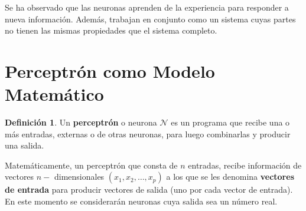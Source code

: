 \documentclass[11pt,letterpaper]{article}
\theoremstyle{definition}
\newtheorem{defi}{Definición}[section]%
\theoremstyle{definition}
\theoremstyle{definition}
\theoremstyle{definition}
\theoremstyle{definition}
\theoremstyle{definition}
\theoremstyle{definition}
\theoremstyle{definition}
\begin{document}
Se ha observado que las neuronas aprenden de la experiencia para responder a nueva información. Además, trabajan en conjunto como un sistema cuyas partes no tienen las mismas propiedades que el sistema completo.
\section{Perceptrón como Modelo Matemático}
\begin{defi}
	Un \textbf{perceptrón} o neurona $ \mathcal{N} $ es un programa que recibe una o más entradas, externas o de otras neuronas, para luego combinarlas y producir una salida.
	
	Matemáticamente, un perceptrón que consta de $ n $ entradas, recibe información de vectores $ n- $ dimensionales $ (x_1, x_2, \dots, x_p) $  a los que se les denomina \textbf{vectores de entrada} para producir vectores de salida (uno por cada vector de entrada).  En este momento se considerarán neuronas cuya salida sea un número real.
\end{defi}
\end{document}
